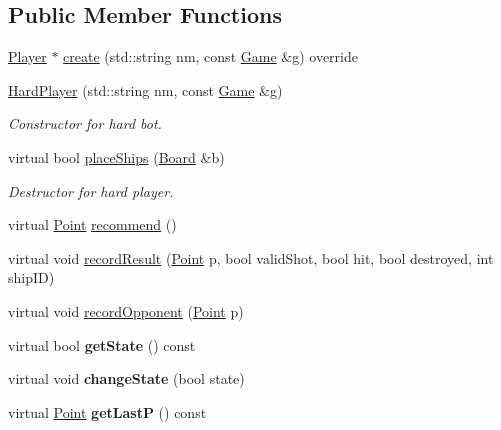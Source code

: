 \subsection*{Public Member Functions}
\begin{DoxyCompactItemize}
\item 
\mbox{\hyperlink{class_player}{Player}} $\ast$ \mbox{\hyperlink{class_hard_player_aa435bcb65ee8b3aea7553196c95fc4e1}{create}} (std\+::string nm, const \mbox{\hyperlink{class_game}{Game}} \&g) override
\item 
\mbox{\hyperlink{class_hard_player_a40d564084e88021b21324672bf67b169}{Hard\+Player}} (std\+::string nm, const \mbox{\hyperlink{class_game}{Game}} \&g)
\begin{DoxyCompactList}\small\item\em Constructor for hard bot. \end{DoxyCompactList}\item 
virtual bool \mbox{\hyperlink{class_hard_player_a27d0ad3353eba585d7a93d2092036f98}{place\+Ships}} (\mbox{\hyperlink{class_board}{Board}} \&b)
\begin{DoxyCompactList}\small\item\em Destructor for hard player. \end{DoxyCompactList}\item 
virtual \mbox{\hyperlink{class_point}{Point}} \mbox{\hyperlink{class_hard_player_ae1d21325a648a88f1bf51f2b0b286190}{recommend}} ()
\item 
virtual void \mbox{\hyperlink{class_hard_player_aa8977ca3294daf996707bd0ff434d69e}{record\+Result}} (\mbox{\hyperlink{class_point}{Point}} p, bool valid\+Shot, bool hit, bool destroyed, int ship\+ID)
\item 
virtual void \mbox{\hyperlink{class_hard_player_a986175fb966099ac5fe39950e18799ae}{record\+Opponent}} (\mbox{\hyperlink{class_point}{Point}} p)
\item 
\mbox{\label{class_hard_player_a063d9f4071b687339fbc134239771ef3}} 
virtual bool {\bfseries get\+State} () const
\item 
\mbox{\label{class_hard_player_aa25afded558192bd39d8d2c1b2a8209a}} 
virtual void {\bfseries change\+State} (bool state)
\item 
\mbox{\label{class_hard_player_ad86f7d42434ae5526d7a1ca4ea65b51a}} 
virtual \mbox{\hyperlink{class_point}{Point}} {\bfseries get\+LastP} () const

\end{DoxyCompactItemize}
